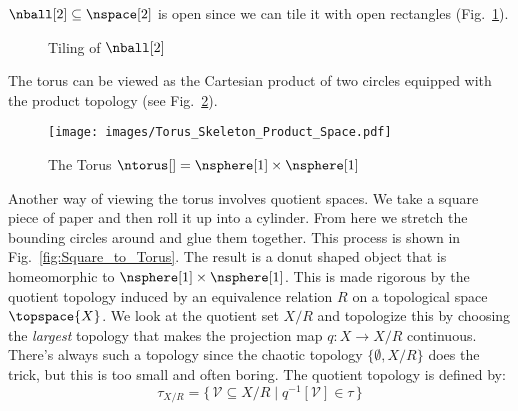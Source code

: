 \documentclass{book}                                                           %
\begin{document}
                $\nball[2]\subseteq\nspace[2]$ is open since we can tile it
                with open rectangles
                (Fig.~\ref{fig:Tiling_Open_Disc_by_Rectangles}).
                \begin{figure}[H]
                    \centering
                    \captionsetup{type=figure}
                    \resizebox{!}{0.70\height}{%
                    }
                    \caption{Tiling of $\nball[2]$}
                    \label{fig:Tiling_Open_Disc_by_Rectangles}
                \end{figure}
                \begin{example}
                    The torus can be viewed as the Cartesian product of two
                    circles equipped with the product topology
                    (see Fig.~\ref{fig:Torus_as_Prod_Space}).
                \end{example}
                \begin{figure}[H]
                    \centering
                    \captionsetup{type=figure}
                    \texttt{[image: images/Torus\_Skeleton\_Product\_Space.pdf]}
                    \caption{The Torus $\ntorus[]=\nsphere[1]\times\nsphere[1]$}
                    \label{fig:Torus_as_Prod_Space}
                \end{figure}
                Another way of viewing the torus involves quotient spaces. We
                take a square piece of paper and then roll it up into a
                cylinder. From here we stretch the bounding circles around and
                glue them together. This process is shown in
                Fig.~\ref{fig:Square_to_Torus}. The result is a donut shaped
                object that is homeomorphic to $\nsphere[1]\times\nsphere[1]$.
                This is made rigorous by the quotient topology induced by an
                equivalence relation $R$ on a topological space
                $\topspace{X}$. We look at the quotient
                set $X/R$ and topologize this by choosing the \textit{largest}
                topology that makes the projection map $q:X\rightarrow{X}/R$
                continuous. There's always such a topology since the chaotic
                topology $\{\emptyset,X/R\}$ does the trick, but this is too
                small and often boring. The quotient topology is defined by:%
                \begin{equation}
                    \tau_{X/R}=\{\,\mathcal{V}\subseteq{X}/R\;|\;
                        q^{\minus{1}}[\mathcal{V}]\in\tau\,\}
                \end{equation}
\end{document}
